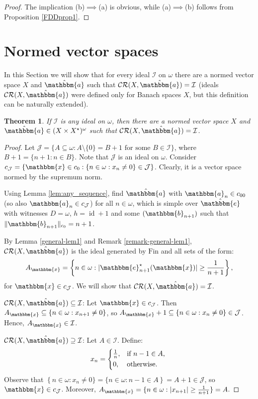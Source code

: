 \documentclass{amsart}
\newcommand{\on}{\operatorname}
\newcommand{\I}{\mathcal{I}}
\newcommand{\J}{\mathcal{J}}
\newcommand{\Fin}{\mathrm{Fin}}
\newcommand{\CR}{\mathcal{CR}}
\newcommand{\w}{\mathbbm}
\newtheorem{theorem}{Theorem}[section]
\begin{document}
\begin{proof}
The implication (b)$\implies$(a) is obvious, while (a)$\implies$(b) follows from Proposition \ref{FDDprop1}.
\end{proof}




\section{Normed vector spaces}\label{S:normed}

In this Section we will show that for every ideal $\I$ on $\omega$ there are a normed vector space $X$ and $\hat{\w{a}}$ such that $\CR(X,\hat{\w{a}})=\I$ (ideals $\CR(X,\hat{\w{a}})$ were defined only for Banach spaces $X$, but this definition can be naturally extended).

\begin{theorem}
If $\I$ is any ideal on $\omega$, then there are a normed vector space $X$ and $\hat{\w{a}}\in(X\times X^\star)^\omega$ such that $\CR(X,\hat{\w{a}})=\I$.
\end{theorem}

\begin{proof}
Let $\J=\{A\subseteq\omega: A\setminus\{0\}=B+1\text{ for some }B\in\I\}$, where $B+1=\{n+1:n\in B\}$. Note that $\J$ is an ideal on $\omega$. Consider $c_{\J}=\{\w{x}\in c_0:\{n\in\omega:x_n\neq 0\}\in\J\}$. Clearly, it is a vector space normed by the supremum norm. 

Using Lemma \ref{lem:any_sequence}, find $\hat{\w{a}}$ with $\w{a}_n\in c_{00}$ (so also $\w{a}_n\in c_{\J}$) for all $n\in\omega$, which is simple over $\hat{\w{e}}$ with witnesses $D=\omega$, $h=\on{id}+1$ and some $(\w{b}_{n+1})$ such that $\|\w{b}_{n+1}\|_{c_0}=n+1$. 

By Lemma \ref{general-lem1} and Remark \ref{remark-general-lem1}, $\CR(X,\hat{\w{a}})$ is the ideal generated by $\Fin$ and all sets of the form:
\[
A_{\w{x}}=\left\{n\in \omega: |\w{e}^\star_{n+1}(\w{x})|\geq\frac{1}{n+1}\right\},
\]
for $\w{x}\in c_{\J}$. We will show that $\CR(X,\hat{\w{a}})=\I$. 

$\CR(X,\hat{\w{a}})\subseteq\I$: Let $\w{x}\in c_{\J}$. Then $A_{\w{x}}\subseteq \{n\in\omega:x_{n+1}\neq 0\}$, so $A_{\w{x}}+1\subseteq \{n\in\omega:x_{n}\neq 0\}\in\J$. Hence, $A_{\w{x}}\in\I$.

$\CR(X,\hat{\w{a}})\supseteq\I$: Let $A\in\I$. Define:
\[
    x_n =
    \begin{cases*}
    \frac{1}{n},     & if $n-1\in A$, \\
    0, & otherwise.  \\
    \end{cases*}
  \]
Observe that $\left\{n\in\omega:x_{n}\neq 0\}=\{n\in\omega:n-1\in A\right\}=A+1\in\J$, so $\w{x}\in c_{\J}$. Moreover, $A_{\w{x}}=\{n\in\omega:|x_{n+1}|\geq\frac{1}{n+1}\}=A$.
\end{proof}
\end{document}
